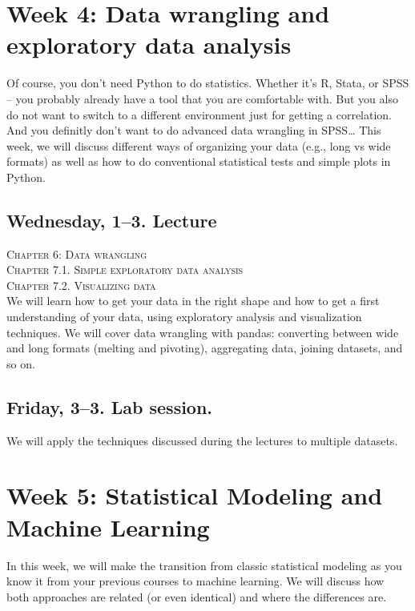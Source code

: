 

\section*{Week 4: Data wrangling and exploratory data analysis}
Of course, you don't need Python to do statistics. Whether it's R, Stata, or SPSS -- you probably already have a tool that you are comfortable with. But you also do not want to switch to a different environment just for getting a correlation. And you definitly don't want to do advanced data wrangling in SPSS\ldots
This week, we will discuss different ways of organizing your data (e.g., long vs wide formats) as well as how to do conventional statistical tests and simple plots in Python.


\subsection*{Wednesday, 1--3. Lecture}
\textsc{ Chapter 6: Data wrangling}\\
\textsc{ Chapter 7.1. Simple exploratory data analysis}\\
\textsc{ Chapter 7.2. Visualizing data}\\

We will learn how to get your data in the right shape and how to get a first understanding of your data, using exploratory analysis and visualization techniques. We will cover data wrangling with pandas: converting between wide and long formats (melting and pivoting), aggregating data, joining datasets, and so on.


\subsection*{Friday, 3--3. Lab session.}
We will apply the techniques discussed during the lectures to multiple datasets.




\section*{Week 5: Statistical Modeling and Machine Learning}
In this week, we will make the transition from classic statistical modeling as you know it from your previous courses to machine learning. We will discuss how both approaches are related  (or even identical) and where the differences are.


